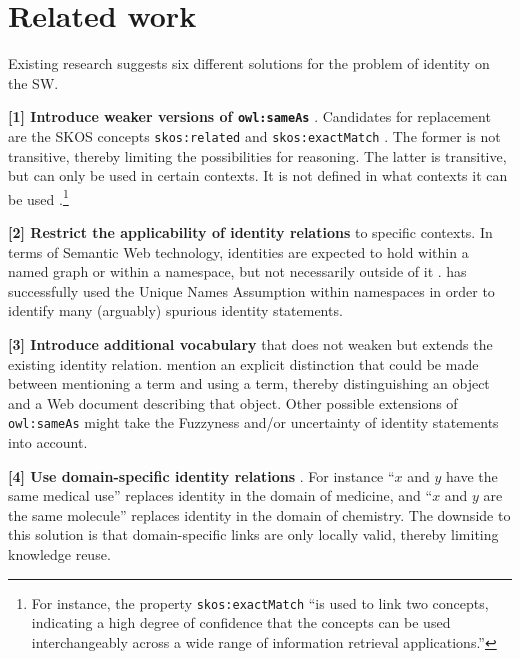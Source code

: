 \section{Related work}
\label{sec:related_work}

Existing research suggests six different solutions for
  the problem of identity on the SW.

\textbf{[1] Introduce weaker versions of {\small \texttt{owl:sameAs}}}
  \cite{HalpinHayes2010,MccuskerMcguinness2010}.
Candidates for replacement are
  the SKOS concepts
  {\small \texttt{skos:related}} and {\small \texttt{skos:exactMatch}}
  \cite{MilesBechhofer2009}.
The former is not transitive,
  thereby limiting the possibilities for reasoning.
The latter is transitive,
  but can only be used in certain contexts.
It is not defined in what contexts it can be used
  \cite{MilesBechhofer2009}.\footnote{
    For instance, the property {\small \texttt{skos:exactMatch}}
    ``is used to link two concepts, indicating a high degree of confidence
    that the concepts can be used interchangeably across a wide range of
    information retrieval applications.''
  }
\begin{comment}
The problem with using weaker notions such as relatedness,
  is that everything is related to everything in \emph{some} way.}
\end{comment}

\textbf{[2] Restrict the applicability of identity relations}
  to specific contexts.
In terms of Semantic Web technology, identities are expected to hold
  within a named graph or within a namespace,
  but not necessarily outside of it \cite{HalpinHayes2010}.
\cite{Melo2013} has successfully used the Unique Names Assumption
  within namespaces in order to identify many (arguably) spurious
  identity statements.

\textbf{[3] Introduce additional vocabulary} that does not weaken but extends
  the existing identity relation.
\cite{HalpinHayes2010} mention an explicit distinction that could be made
  between mentioning a term and using a term,
  thereby distinguishing an object and a Web document describing that object.
Other possible extensions of {\small \texttt{owl:sameAs}} might take
  the Fuzzyness and/or uncertainty of identity statements into account.

\textbf{[4] Use domain-specific identity relations}
  \cite{MccuskerMcguinness2010}.
For instance
    ``$x$ and $y$ have the same medical use''
  replaces
    identity in the domain of medicine,
and
    ``$x$ and $y$ are the same molecule''
  replaces
    identity in the domain of chemistry.
The downside to this solution is that domain-specific links are
  only locally valid, thereby limiting knowledge reuse.

